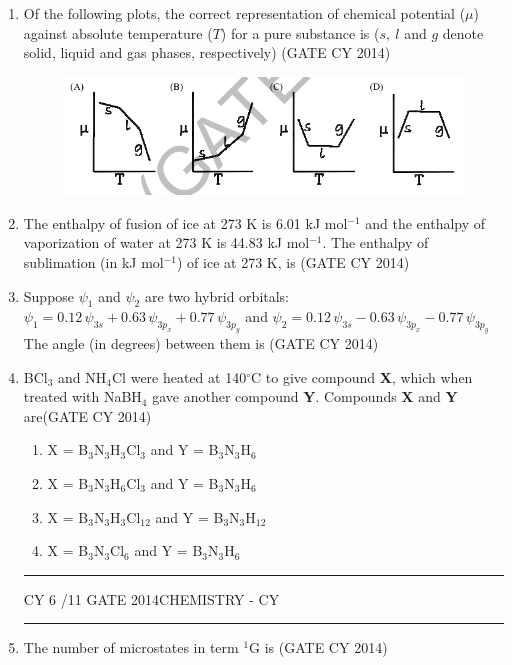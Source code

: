 \documentclass[a4paper,10pt]{exam}
\theoremstyle{remark}
\begin{document}
\begin{enumerate}
\item Of the following plots, the correct representation of chemical potential ($\mu$) against absolute temperature ($T$) for a pure substance is ($s,~l$ and $g$ denote solid, liquid and gas phases, respectively) \hfill{(GATE CY 2014)}
\begin{figure}[H]
    \centering
    \includegraphics[width=0.9\columnwidth]{figs/Q 33.png}
    \caption{}
    \label{fig:placeholder}
\end{figure}
\item The enthalpy of fusion of ice at 273 K is 6.01 kJ mol$^{-1}$ and the enthalpy of vaporization of water at 273 K is 44.83 kJ mol$^{-1}$. The enthalpy of sublimation (in kJ mol$^{-1}$) of ice at 273 K, is \underline{\hspace{2cm}}\hfill{(GATE CY 2014)}
\item Suppose $\psi_1$ and $\psi_2$ are two hybrid orbitals:\\
$
\psi_1=0.12\,\psi_{3s}+0.63\,\psi_{3p_x}+0.77\,\psi_{3p_y}
$
and
$
\psi_2=0.12\,\psi_{3s}-0.63\,\psi_{3p_x}-0.77\,\psi_{3p_y}
$
The angle (in degrees) between them is \underline{\hspace{2cm}}\hfill{(GATE CY 2014)}
\item BCl$_3$ and NH$_4$Cl were heated at 140$^\circ$C to give compound \textbf{X}, which when treated with NaBH$_4$ gave another compound \textbf{Y}. Compounds \textbf{X} and \textbf{Y} are\hfill{(GATE CY 2014)}
\begin{enumerate}
    \item X = B$_3$N$_3$H$_3$Cl$_3$ and Y = B$_3$N$_3$H$_6$
    \item X = B$_3$N$_3$H$_6$Cl$_3$ and Y = B$_3$N$_3$H$_6$
    \item X = B$_3$N$_3$H$_3$Cl$_{12}$ and Y = B$_3$N$_3$H$_{12}$
    \item X = B$_3$N$_3$Cl$_6$ and Y = B$_3$N$_3$H$_6$
\end{enumerate}
\vfill
\noindent\rule{\linewidth}{0.4pt}
CY \hfill 6 /11
\newpage
GATE 2014\hfill CHEMISTRY - CY\\
\noindent\rule{\linewidth}{0.4pt}
\item The number of microstates in term $^1$G is \underline{\hspace{2cm}}\hfill{(GATE CY 2014)}

\end{enumerate}
\end{document}
